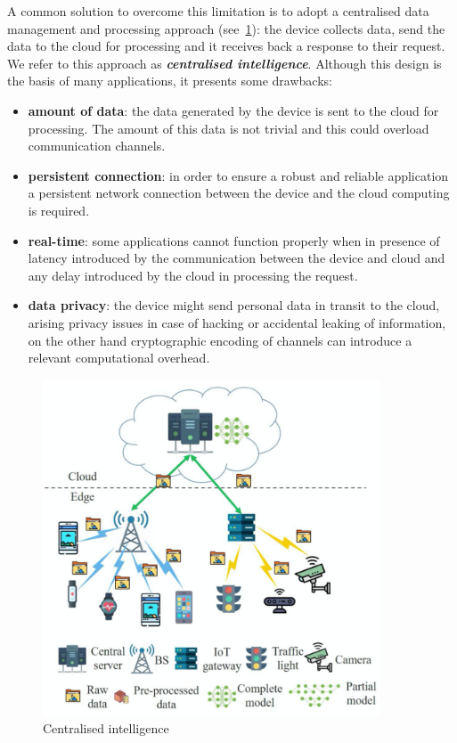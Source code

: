 A common solution to overcome this limitation is to adopt a centralised data
management and processing approach
(see~\ref{fig:centralised_intelligence}): the device collects data, send the
data to the cloud for processing and it receives back a response to their
request. We refer to this approach as
\textbf{\textit{centralised intelligence}}.
Although this design is the basis of many applications, it presents some
drawbacks:
\begin{itemize}
    \item \textbf{amount of data}: the data generated by the device is sent to
        the cloud for processing. The amount of this data is not trivial and
        this could overload communication channels.
    \item \textbf{persistent connection}: in order to ensure a robust and
        reliable application a persistent network connection between the device
        and the cloud computing is required.
    \item \textbf{real-time}: some applications cannot function properly when
        in presence of latency introduced by the communication between the
        device and cloud and any delay introduced by the cloud in processing
        the request.
    \item \textbf{data privacy}: the device might send personal data in transit
        to the cloud, arising privacy issues in case of hacking or accidental
        leaking of information, on the other hand cryptographic encoding of
        channels can introduce a relevant computational overhead.
\end{itemize}

\begin{figure}[ht]
    \includegraphics[width=10cm]{images/introduction/centralised_intelligence.png}
    \centering
    \caption{Centralised intelligence}\label{fig:centralised_intelligence}
\end{figure}

